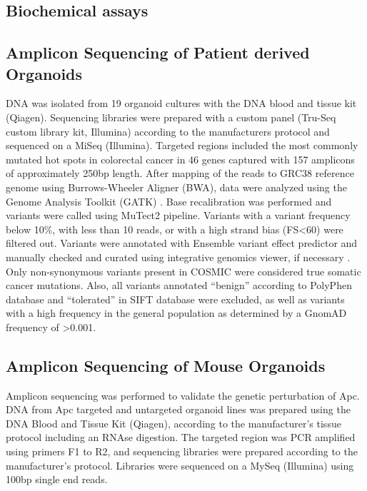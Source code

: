 \begin{flushleft}
\section{Biochemical assays}


\subsection{Amplicon Sequencing of Patient derived Organoids}
DNA was isolated from 19 organoid cultures with the DNA blood and tissue kit (Qiagen). Sequencing libraries were prepared with a custom panel (Tru-Seq custom library kit, Illumina) according to the manufacturers protocol and sequenced on a MiSeq (Illumina). Targeted regions included the most commonly mutated hot spots in colorectal cancer in 46 genes captured with 157 amplicons of approximately 250bp length. After mapping of the reads to GRC38 reference genome using Burrows-Wheeler Aligner (BWA), data were analyzed using the Genome Analysis Toolkit (GATK) \cite{McKenna2010-cq}. Base recalibration was performed and variants were called using MuTect2 pipeline. Variants with a variant frequency below 10\%, with less than 10 reads, or with a high strand bias (FS<60) were filtered out. Variants were annotated with Ensemble variant effect predictor \cite{McLaren2016-dp} and manually checked and curated using integrative genomics viewer, if necessary \cite{Robinson2011-pc}. Only non-synonymous variants present in COSMIC \cite{Forbes2008-tk} were considered true somatic cancer mutations.
Also, all variants annotated “benign” according to PolyPhen database and “tolerated” in SIFT database were excluded, as well as variants with a high frequency in the general population as determined by a GnomAD \cite{Lek2016-dk} frequency of >0.001.

\subsection{Amplicon Sequencing of Mouse Organoids}
Amplicon sequencing was performed to validate the genetic perturbation of Apc. DNA from Apc targeted and untargeted organoid lines was prepared using the DNA Blood and Tissue Kit (Qiagen), according to the manufacturer’s tissue protocol including an RNAse digestion. The targeted region was PCR amplified using primers F1 to R2, and sequencing libraries were prepared according to the manufacturer’s protocol. Libraries were sequenced on a MySeq (Illumina) using 100bp single end reads. 


\end{flushleft}
